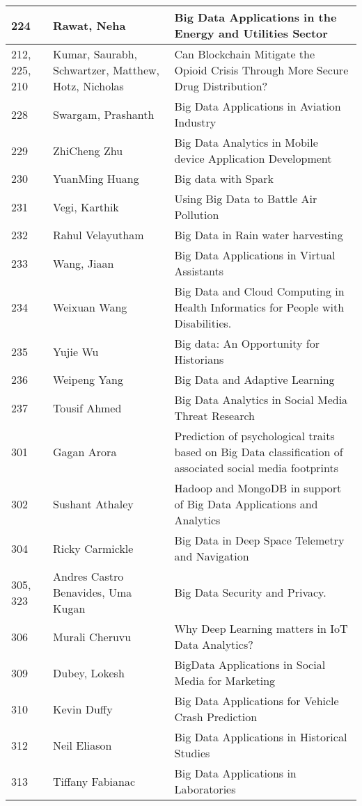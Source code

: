\documentclass[12pt]{book}
\begin{document}
\begin{footnotesize}
\begin{longtable}{|p{1cm}p{5cm}p{9cm}|}
\hline
\hline
224 & Rawat, Neha & Big Data Applications in the Energy and Utilities Sector  \\
\hline
212, 225, 210 & Kumar, Saurabh, Schwartzer, Matthew, Hotz, Nicholas & Can Blockchain Mitigate the Opioid Crisis Through More Secure Drug Distribution?  \\
\hline
228 & Swargam, Prashanth & Big Data Applications in Aviation Industry  \\
\hline
229 & ZhiCheng Zhu & Big Data Analytics in Mobile device Application Development  \\
\hline
230 & YuanMing Huang & Big data with Spark  \\
\hline
231 & Vegi, Karthik & Using Big Data to Battle Air Pollution  \\
\hline
232 & Rahul Velayutham & Big Data in Rain water harvesting  \\
\hline
233 & Wang, Jiaan & Big Data Applications in Virtual Assistants  \\
\hline
234 & Weixuan Wang & Big Data and Cloud Computing in Health Informatics for People with Disabilities.
  \\
\hline
235 & Yujie Wu & Big data: An Opportunity for Historians  \\
\hline
236 & Weipeng Yang & Big Data and Adaptive Learning  \\
\hline
237 & Tousif Ahmed & Big Data Analytics in Social Media Threat Research  \\
\hline
301 & Gagan Arora & Prediction of psychological traits based on Big Data classification of associated social media footprints
  \\
\hline
302 & Sushant Athaley & Hadoop and MongoDB in support of Big Data Applications and Analytics  \\
\hline
304 & Ricky Carmickle & Big Data in Deep Space Telemetry and Navigation  \\
\hline
305, 323 & Andres Castro Benavides, Uma Kugan & Big Data Security and Privacy.  \\
\hline
306 & Murali Cheruvu & Why Deep Learning matters in IoT Data Analytics?  \\
\hline
\hline
309 & Dubey, Lokesh & BigData Applications in Social Media for Marketing  \\
\hline
310 & Kevin Duffy & Big Data Applications for Vehicle Crash Prediction  \\
\hline
\hline
312 & Neil Eliason & Big Data Applications in Historical Studies  \\
\hline
313 & Tiffany Fabianac & Big Data Applications in Laboratories  \\

\end{longtable}
\end{footnotesize}
\end{document}

